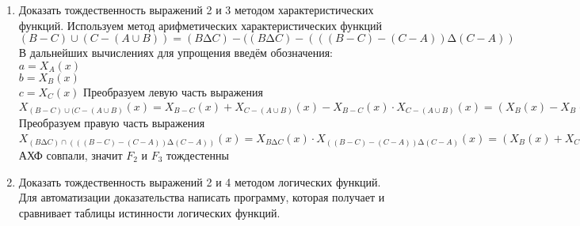 \documentclass[a4paper,14pt]{extarticle}
\begin{document}
\begin{enumerate}[№1. ]
	 		\item Доказать тождественность выражений 2 и 3 методом характеристических функций.\bigbreak
		 Используем метод арифметических характеристических функций\\
		 $(B-C)\cup(C-(A\cup B)) =(B ∆ C) - ((B ∆ C) - (((B - C) - (C - A))  ∆ (C - A))$\\
		 В дальнейших вычислениях для упрощения введём обозначения:\\
		 $a = X_A(x)$\\
		 $b = X_B(x)$\\
		 $c = X_C(x)$\bigbreak
		 Преобразуем левую часть выражения\\
		 $X_{(B-C)\cup(C-(A\cup B)}(x)=X_{B-C}(x)+X_{C-(A\cup B)}(x)-X_{B-C}(x)\cdot X_{C-(A\cup B)}(x)=
		 (X_B(x) - X_B(x) \cdot X_C(x)) +
		 (X_C(x) - X_C(x) \cdot X_{A\cup B}(x)) -
		 (X_B(x) - X_B(x) \cdot X_C(x)) \cdot
		 (X_C(x) - X_C(x) \cdot X_{A\cup B}(x))=
		 (X_B(x) - X_B(x) \cdot X_C(x)) + (X_C(x) - X_C(x) \cdot (X_A(x) + X_B(x) - X_A(x) \cdot X_B(x))) - (X_B(x) - X_B(x) \cdot X_C(x)) \cdot (X_C(x) - X_C(x) \cdot (X_A(x) + X_B(x) - X_A(x) \cdot X_B(x)))=
		 (b - b  c) + (c - c  (a + b - a  b)) - (b - b  c)  (c - c  (a + b - a  b)) = 
		 b + c + bc^2 + cb^2 - ac - b^2c^2 - 3bc + ab^2c^2 - abc^2 - acb^2 + 2abc =
		 b + c + bc + cb - ac - bc - 3bc + abc - abc - acb + 2abc=
		 b + c - ac - 2bc + abc=X_B(x)+X_C(x)-X_A(x) \cdot X_C(x) - 2 \cdot X_B(x) \cdot X_C(x) + X_A(x) \cdot X_B(x) \cdot X_C(x)
		 $\\
		 Преобразуем правую часть выражения\\
		 $ X_{(B ∆ C)\cap (((B - C) - (C - A))  ∆ (C - A))}(x) = 
		 X_{B ∆ C}(x) \cdot X_{((B - C) - (C - A))  ∆ (C - A)}(x)=
		 (X_B(x) + X_C(x) - 2 \cdot X_B(x) \cdot X_C(x)) \cdot  (X_{(B - C) - (C - A)}(x) + X_{C - A}(x) - 2 \cdot X_{(B - C) - (C - A)}(x) \cdot X_{C - A}(x))=
		 (X_B(x) + X_C(x) - 2 \cdot X_B(x) \cdot X_C(x)) \cdot  (    X_{B-C}(x) - X_{B-C}(x) \cdot X_{C-A}   +        X_C(x) -  X_C(x) \cdot X_A(x)              - 2 \cdot (X_{B-C}(x) - X_{B-C}(x) \cdot X_{C-A}) \cdot (X_C(x) -  X_C(x) \cdot X_A(x)))=
		 (X_B(x) + X_C(x) - 2 \cdot X_B(x) \cdot X_C(x)) \cdot  (    X_B(x) - X_B(x) \cdot X_C(x)  - (X_B(x) - X_B(x) \cdot X_C(x)) \cdot (X_C(x) - X_C(x) \cdot X_A(x))   +        X_C(x) -  X_C(x) \cdot X_A(x)              - 2 \cdot (X_B(x) - X_B(x) \cdot X_C(x)  - (X_B(x) - X_B(x) \cdot X_C(x)) \cdot (X_C(x) - X_C(x) \cdot X_A(x)) ) \cdot (X_C(x) -  X_C(x) \cdot X_A(x)))=(b + c - 2  b  c)   (    b - b  c  - (b - b  c)  (c - c  a)   +        c -  c  a              - 2  (b - b  c  - (b - b  c)  (c - c  a) )  (c -  c  a))=(b + c - 2  b  c)   (    b - b  c    +  c -  c  a ))=b-bc+bc-abc+bc-bc+c-ac-2bc+2bc-2bc+2abc=b+c-ac+abc-2bc=X_B(x)+X_C(x)-X_A(x) \cdot X_C(x) - 2 \cdot X_B(x) \cdot X_C(x) + X_A(x) \cdot X_B(x) \cdot X_C(x)$\bigbreak
		 АХФ совпали, значит $F_2$ и $F_3$ тождестенны
		 \newpage
\item Доказать тождественность выражений 2 и 4 методом  логических функций. Для автоматизации доказательства написать программу, которая получает и сравнивает таблицы истинности логических функций.\\


\end{enumerate}
\end{document}
